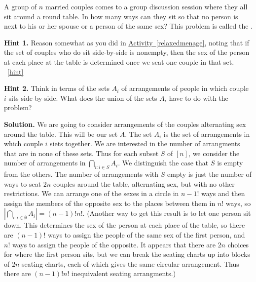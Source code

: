\documentclass{book}
\begin{document}
\setcounter{project}{227}
\addtocounter{project}{-1}
\begin{activity}[]\label{activity-220}
\hypertarget{p-1228}{}%
A group of \(n\) married couples comes to a group discussion session where they all sit around a round table. In how many ways can they sit so that no person is next to his or her spouse or a person of the same sex? This problem is called the .%
\par\smallskip%
\noindent\textbf{Hint 1.}\hypertarget{hint-148}{}\quad%
\hypertarget{p-1229}{}%
Reason somewhat as you did in \hyperref[relaxedmenage]{Activity~\ref{relaxedmenage}}, noting that if the set of couples who do sit side-by-side is nonempty, then the sex of the person at each place at the table is determined once we seat one couple in that set.%
~\hfill{\tiny\hyperlink{a-227}{[hint]}\hypertarget{q-227}{}}\par\smallskip%
\noindent\textbf{Hint 2.}\hypertarget{hint-149}{}\quad%
\hypertarget{p-1230}{}%
Think in terms of the sets \(A_i\) of arrangements of people in which couple \(i\) sits side-by-side. What does the union of the sets \(A_i\) have to do with the problem?%
\par\smallskip%
\noindent\textbf{Solution.}\hypertarget{solution-128}{}\quad%
\hypertarget{p-1231}{}%
We are going to consider arrangements of the couples alternating sex around the table. This will be our set \(A\). The set \(A_i\) is the set of arrangements in which couple \(i\) siets together. We are interested in the number of arrangments that are in none of these sets. Thus for each subset \(S\) of \([n]\), we consider the number of arrangements in \(\displaystyle\bigcap_{i\colon i\in S} A_i\). We distinguish the case that \(S\) is empty from the others. The number of arrangements with \(S\) empty is just the number of ways to seat \(2n\) couples around the table, alternating sex, but with no other restrictions. We can arrange one of the sexes in a circle in \(n-1!\) ways and then assign the members of the opposite sex to the places between them in \(n!\) ways, so \(\displaystyle \left|\bigcap_{i\colon i\in \emptyset} A_i \right| = (n-1)!n!\). (Another way to get this result is to let one person sit down. This determines the sex of the person at each place of the table, so there are \((n-1)!\) ways to assign the people of the same sex of the first person, and \(n!\) ways to assign the people of the opposite. It appears that there are \(2n\) choices for where the first person sits, but we can break the seating charts up into blocks of \(2n\) seating charts, each of which gives the same circular arrangement. Thus there are \((n-1)!n!\) inequivalent seating arrangments.)%

\end{activity}
\end{document}
